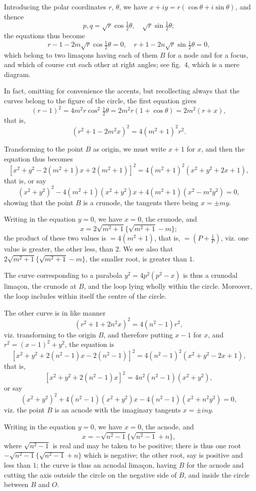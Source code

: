 \documentclass[11pt,a4paper]{book}
\begin{document}
Introducing the polar coordinates $r$, $\theta$, we have $x + iy = r(\cos\theta + i\sin\theta)$, and thence
\[
p, q = \sqrt{r}\cos\tfrac{1}{2}\theta, \quad \sqrt{r}\sin\tfrac{1}{2}\theta;
\]
the equations thus become
\[
r - 1 - 2m\sqrt{r}\cos\tfrac{1}{2}\theta = 0, \quad r + 1 - 2n\sqrt{r}\sin\tfrac{1}{2}\theta = 0,
\]
which belong to two lima\c{c}ons having each of them $B$ for a node and for a focus, and which of course cut each other at right angles; see fig.~4, which is a mere diagram.

In fact, omitting for convenience the accents, but recollecting always that the curves belong to the figure of the circle, the first equation gives
\[
(r - 1)^2 = 4m^2r\cos^2\tfrac{1}{2}\theta = 2m^2r(1 + \cos\theta) = 2m^2(r + x),
\]
that is,
\[
(r^2 + 1 - 2m^2x)^2 = 4(m^2 + 1)^2r^2.
\]

Transforming to the point $B$ as origin, we must write $x + 1$ for $x$, and then the equation thus becomes
\[
[x^2 + y^2 - 2(m^2 + 1)x + 2(m^2 + 1)]^2 = 4(m^2 + 1)^2(x^2 + y^2 + 2x + 1),
\]
that is, or say
\[
(x^2 + y^2)^2 - 4(m^2 + 1)(x^2 + y^2)x + 4(m^2 + 1)(x^2 - m^2y^2) = 0,
\]
showing that the point $B$ is a crunode, the tangents there being $x = \pm my$.

Writing in the equation $y = 0$, we have $x = 0$, the crunode, and
\[
x = 2\sqrt{m^2 + 1}\{\sqrt{m^2 + 1} - m\};
\]
the product of these two values is $= 4(m^2 + 1)$, that is, $= (P + \frac{1}{P})$, viz. one value is greater, the other less, than $2$. We see also that $2\sqrt{m^2 + 1}\{\sqrt{m^2 + 1} - m\}$, the smaller root, is greater than $1$.

The curve corresponding to a parabola $y^2 = 4p^2(p^2 - x)$ is thus a crunodal lima\c{c}on, the crunode at $B$, and the loop lying wholly within the circle. Moreover, the loop includes within itself the centre of the circle.

The other curve is in like manner
\[
(r^2 + 1 + 2n^2x)^2 = 4(n^2 - 1)r^2,
\]
viz. transforming to the origin $B$, and therefore putting $x - 1$ for $x$, and $r^2 = (x-1)^2 + y^2$, the equation is
\[
[x^2 + y^2 + 2(n^2 - 1)x - 2(n^2 - 1)]^2 = 4(n^2 - 1)^2(x^2 + y^2 - 2x + 1),
\]
that is,
\[
[x^2 + y^2 + 2(n^2 - 1)x]^2 = 4n^2(n^2 - 1)(x^2 + y^2),
\]
or say
\[
(x^2 + y^2)^2 + 4(n^2 - 1)(x^2 + y^2)x - 4(n^2 - 1)(x^2 + n^2y^2) = 0,
\]
viz. the point $B$ is an acnode with the imaginary tangents $x = \pm iny$.

Writing in the equation $y = 0$, we have $x = 0$, the acnode, and
\[
x = -\sqrt{n^2 - 1}\{\sqrt{n^2 - 1} + n\},
\]
where $\sqrt{n^2 - 1}$ is real and may be taken to be positive; there is thus one root $-\sqrt{n^2 - 1}\{\sqrt{n^2 - 1} + n\}$ which is negative; the other root, say is positive and less than $1$; the curve is thus an acnodal lima\c{c}on, having $B$ for the acnode and cutting the axis outside the circle on the negative side of $B$, and inside the circle between $B$ and $O$.
\end{document}
